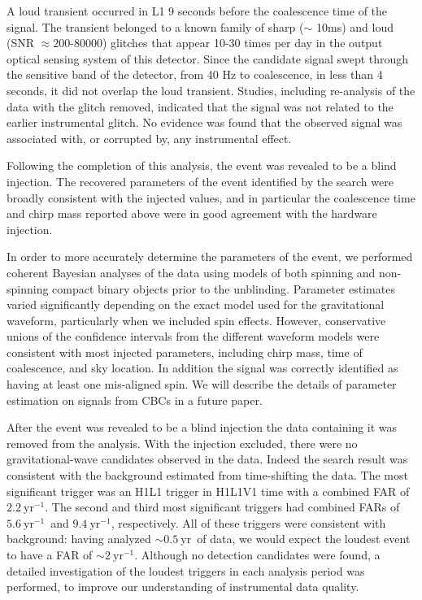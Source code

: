 \documentclass[prd,superscriptaddress,showpacs,amssymb,amsmath,amsfonts,aps,altaffilletter,nofootinbib,letterpaper,twocolumn]{revtex4}
\def\firstFAR{\ensuremath{\mathrm{2.2~yr^{-1}}}}
\def\secondFAR{\ensuremath{\mathrm{5.6~yr^{-1}}}}
\def\thirdFAR{\ensuremath{\mathrm{9.4~yr^{-1}}}}
\def\expectedLoudestFAR{\ensuremath{\mathrm{\sim2~yr^{-1}}}}
\begin{document}
A loud transient occurred in L1 9 seconds before the coalescence time of the
signal. The transient belonged to a known family of sharp ($\sim$ 10ms) and
loud (SNR $\approx 200$-$80000$) glitches that appear 10-30 times per day in
the output optical sensing system of this detector. Since the candidate signal
swept through the sensitive band of the detector, from 40 Hz to coalescence,
in less than 4 seconds, it did not overlap the loud transient.  Studies,
including re-analysis of the data with the glitch removed, indicated that the
signal was not related to the earlier instrumental glitch.  No evidence was
found that the observed signal was associated with, or corrupted by, any
instrumental effect.  

Following the completion of this analysis, the event was revealed to be
a blind injection.  The recovered parameters of the event identified by
the search were broadly consistent with the injected values, and in
particular the coalescence time and chirp mass reported above were in
good agreement with the hardware injection.

In order to more accurately determine the parameters of the event, we performed
coherent Bayesian analyses of the data using models of both spinning and
non-spinning compact binary objects prior to the unblinding. Parameter
estimates varied signiﬁcantly depending on the exact model used for the
gravitational waveform, particularly when we included spin effects. However,
conservative unions of the confidence intervals from the different waveform
models were consistent with most injected parameters, including chirp mass,
time of coalescence, and sky location. In addition the signal was correctly
identified as having at least one mis-aligned spin. We will describe the
details of parameter estimation on signals from \acp{CBC} in a future paper.

After the event was revealed to be a blind injection the data containing it was
removed from the analysis. With the injection excluded, there were no
gravitational-wave candidates observed in the data. Indeed the search result
was consistent with the background estimated from time-shifting the data.  The
most significant trigger was an H1L1 trigger in H1L1V1 time with a
combined FAR of \firstFAR. The second and third most significant triggers had
combined FARs of \secondFAR~and \thirdFAR, respectively. All of these triggers
were consistent with background: having analyzed
$\mathrm{\sim0.5~yr}$~of data, we would expect the loudest event to
have a FAR of \expectedLoudestFAR. Although no detection candidates were found,
a detailed investigation of the loudest triggers in each analysis period was
performed, to improve our understanding of instrumental data quality.
\end{document}
